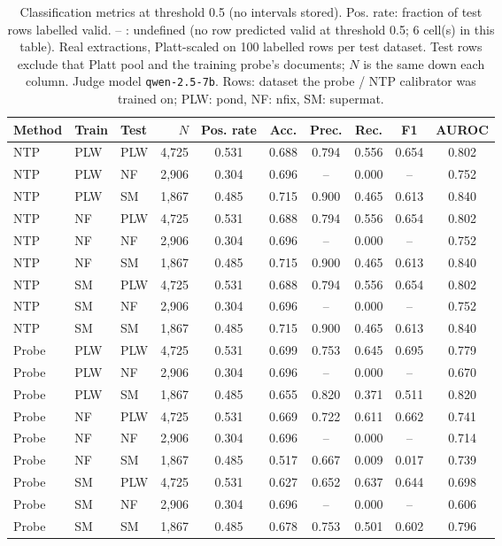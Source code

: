 \begin{table}[t]
\centering
\small
\caption{Classification metrics at threshold 0.5 (no intervals stored). Pos. rate: fraction of test rows labelled valid. -- : undefined (no row predicted valid at threshold 0.5; 6 cell(s) in this table). Real extractions, Platt-scaled on 100 labelled rows per test dataset. Test rows exclude that Platt pool and the training probe's documents; $N$ is the same down each column. Judge model \texttt{qwen-2.5-7b}. Rows: dataset the probe / NTP calibrator was trained on; PLW: pond, NF: nfix, SM: supermat.}
\label{tab:calibration-real-classification}
\begin{tabular}{lllrcccccc}
\toprule
Method & Train & Test & $N$ & Pos. rate & Acc. & Prec. & Rec. & F1 & AUROC \\
\midrule
NTP & PLW & PLW & 4{,}725 & 0.531 & 0.688 & 0.794 & 0.556 & 0.654 & 0.802 \\
NTP & PLW & NF & 2{,}906 & 0.304 & 0.696 & -- & 0.000 & -- & 0.752 \\
NTP & PLW & SM & 1{,}867 & 0.485 & 0.715 & 0.900 & 0.465 & 0.613 & 0.840 \\
NTP & NF & PLW & 4{,}725 & 0.531 & 0.688 & 0.794 & 0.556 & 0.654 & 0.802 \\
NTP & NF & NF & 2{,}906 & 0.304 & 0.696 & -- & 0.000 & -- & 0.752 \\
NTP & NF & SM & 1{,}867 & 0.485 & 0.715 & 0.900 & 0.465 & 0.613 & 0.840 \\
NTP & SM & PLW & 4{,}725 & 0.531 & 0.688 & 0.794 & 0.556 & 0.654 & 0.802 \\
NTP & SM & NF & 2{,}906 & 0.304 & 0.696 & -- & 0.000 & -- & 0.752 \\
NTP & SM & SM & 1{,}867 & 0.485 & 0.715 & 0.900 & 0.465 & 0.613 & 0.840 \\
\midrule
Probe & PLW & PLW & 4{,}725 & 0.531 & 0.699 & 0.753 & 0.645 & 0.695 & 0.779 \\
Probe & PLW & NF & 2{,}906 & 0.304 & 0.696 & -- & 0.000 & -- & 0.670 \\
Probe & PLW & SM & 1{,}867 & 0.485 & 0.655 & 0.820 & 0.371 & 0.511 & 0.820 \\
Probe & NF & PLW & 4{,}725 & 0.531 & 0.669 & 0.722 & 0.611 & 0.662 & 0.741 \\
Probe & NF & NF & 2{,}906 & 0.304 & 0.696 & -- & 0.000 & -- & 0.714 \\
Probe & NF & SM & 1{,}867 & 0.485 & 0.517 & 0.667 & 0.009 & 0.017 & 0.739 \\
Probe & SM & PLW & 4{,}725 & 0.531 & 0.627 & 0.652 & 0.637 & 0.644 & 0.698 \\
Probe & SM & NF & 2{,}906 & 0.304 & 0.696 & -- & 0.000 & -- & 0.606 \\
Probe & SM & SM & 1{,}867 & 0.485 & 0.678 & 0.753 & 0.501 & 0.602 & 0.796 \\
\bottomrule
\end{tabular}
\end{table}
